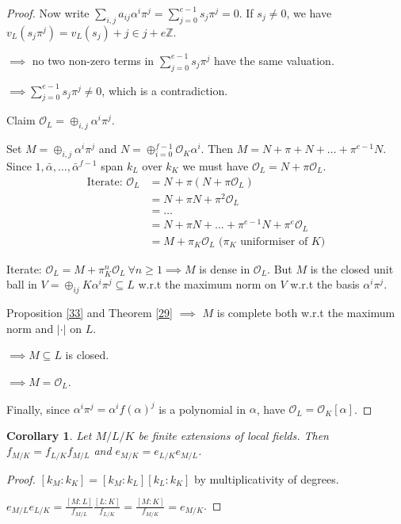 \documentclass[a4paper]{article}
\newtheorem{corollary}[definition]{Corollary}
\newcommand*\abs[1]{\left|#1\right|}
\begin{document}
\begin{proof}
	Now write $\sum_{i,j} a_{ij}\alpha^i\pi^j = \sum_{j=0}^{e-1}s_j\pi^j = 0$.
	If $s_j \neq 0$, we have $v_L(s_j\pi^j) = v_L(s_j) + j \in j+e\mathbb{Z}$.
	
	$\implies$ no two non-zero terms in $\sum_{j=0}^{e-1}s_j\pi^j$ have the same valuation.
	
	$\implies \sum_{j=0}^{e-1} s_j\pi^j \neq 0$, which is a contradiction.
	
	Claim $\mathcal{O}_L = \oplus_{i,j}\alpha^i\pi^j$.
	
	Set $M=\oplus_{i,j}\alpha^i\pi^j$ and $N=\oplus_{i=0}^{f-1}\mathcal{O}_K\alpha^i$.
	Then $M=N+\pi+N+\dots+\pi^{e-1}N$.
	Since $1, \bar{\alpha}, \dots, \bar{\alpha}^{f-1}$ span $k_L$ over $k_K$ we must have $\mathcal{O}_L=N+\pi\mathcal{O}_L$.
	\begin{align*}
		\text{Iterate: } \mathcal{O}_L &= N + \pi(N + \pi\mathcal{O}_L) \\
		&= N + \pi N + \pi^2 \mathcal{O}_L \\
		&= \dots \\
		&= N + \pi N + \dots + \pi^{e-1}N + \pi^e \mathcal{O}_L \\
		&= M + \pi_K \mathcal{O}_L \text{ ($\pi_K$ uniformiser of $K$)}
	\end{align*}
	
	Iterate: $\mathcal{O}_L = M + \pi_K^n\mathcal{O}_L\ \forall n \geq 1 \implies M$ is dense in $\mathcal{O}_L$.
	But $M$ is the closed unit ball in $V = \oplus_{ij}K\alpha^i\pi^j \subseteq L$ w.r.t the maximum norm on $V$ w.r.t the basis $\alpha^i\pi^j$.
	
	Proposition \ref{33} and Theorem \ref{29} $\implies$ $M$ is complete both w.r.t the maximum norm and $\abs{\cdot}$ on $L$.
	
	$\implies M \subseteq L$ is closed.
	
	$\implies M = \mathcal{O}_L$.
	
	Finally, since $\alpha^i\pi^j = \alpha^if(\alpha)^j$ is a polynomial in $\alpha$, have $\mathcal{O}_L = \mathcal{O}_K[\alpha]$.
\end{proof}

\begin{corollary}
	Let $M/L/K$ be finite extensions of local fields.
	Then $f_{M/K} = f_{L/K}f_{M/L}$ and $e_{M/K} = e_{L/K}e_{M/L}$.
	\label{71}
\end{corollary}
\begin{proof}
	$[k_M:k_K] = [k_M:k_L][k_L:k_K]$ by multiplicativity of degrees.
	
	$e_{M/L}e_{L/K} = \frac{[M:L]}{f_{M/L}}\frac{[L:K]}{f_{L/K}} = \frac{[M:K]}{f_{M/K}} = e_{M/K}$.
\end{proof}
\end{document}
